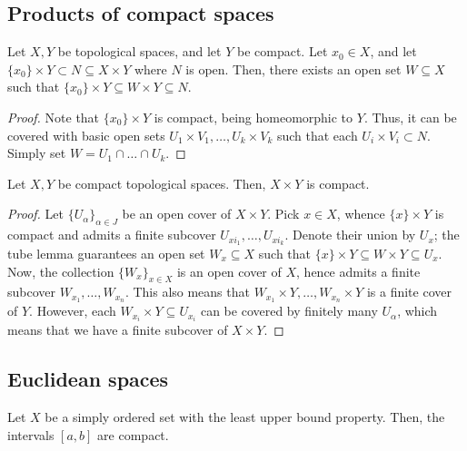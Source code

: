 \documentclass[11pt]{article}
\theoremstyle{definition}
\theoremstyle{remark}
\numberwithin{equation}{section}
\begin{document}
    \subsection{Products of compact spaces}

    \begin{lemma}
        Let $X, Y$ be topological spaces, and let $Y$ be compact. Let $x_0 \in X$,
        and let $\{x_0\} \times Y \subset N \subseteq X \times Y$ where $N$ is open.
        Then, there exists an open set $W \subseteq X$ such that $\{x_0\} \times Y
        \subseteq W \times Y \subseteq N$.
    \end{lemma}
    \begin{proof}
        Note that $\{x_0\}\times Y$ is compact, being homeomorphic to $Y$. Thus, it
        can be covered with basic open sets $U_1\times V_1, \dots, U_k\times V_k$
        such that each $U_i \times V_i \subset N$. Simply set $W = U_1 \cap \dots
        \cap U_k$.
    \end{proof}

    \begin{theorem}
        Let $X, Y$ be compact topological spaces. Then, $X \times Y$ is compact.
    \end{theorem}
    \begin{proof}
        Let $\{U_\alpha\}_{\alpha \in J}$ be an open cover of $X \times Y$. Pick $x
        \in X$, whence $\{x\} \times Y$ is compact and admits a finite subcover
        $U_{xi_1}, \dots, U_{xi_k}$. Denote their union by $U_x$; the tube lemma
        guarantees an open set $W_x \subseteq X$ such that $\{x\} \times Y \subseteq
        W\times Y \subseteq U_x$. Now, the collection $\{W_x\}_{x \in X}$ is an open
        cover of $X$, hence admits a finite subcover $W_{x_1}, \dots, W_{x_n}$. This
        also means that $W_{x_1}\times Y, \dots, W_{x_n} \times Y$ is a finite cover
        of $Y$. However, each $W_{x_i} \times Y \subseteq U_{x_i}$ can be covered by
        finitely many $U_\alpha$, which means that we have a finite subcover of $X
        \times Y$.
    \end{proof}


    \subsection{Euclidean spaces}

    \begin{lemma}
        Let $X$ be a simply ordered set with the least upper bound property. Then,
        the intervals $[a, b]$ are compact.
    \end{lemma}
\end{document}
